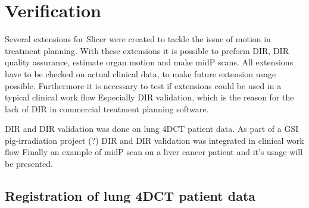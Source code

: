\documentclass[type=dr, dr=rernat, accentcolor=tud7b,colorbacktitle, bigchapter, openright, twoside, 12pt ]{tudthesis}
\begin{document}
% 
% 


\newpage
\section{Verification}
\label{Verification}

Several extensions for Slicer were created to tackle the issue of motion in treatment planning. With these extensions it is possible to preform DIR, DIR quality assurance, estimate organ motion and make midP scans. All extensions have to be checked on actual clinical data, to make future extension usage possible. Furthermore it is necessary to test if extensions could be used in a typical clinical work flow Especially DIR validation, which is the reason for the lack of DIR in commercial treatment planning software. 

DIR and DIR validation was done on lung 4DCT patient data. As part of a GSI pig-irradiation project (?) DIR and DIR validation was integrated in clinical work flow Finally an example of midP scan on a liver cancer patient and it's usage will be presented.

\subsection{Registration of lung 4DCT patient data}
\label{lungDIR}
\end{document}
